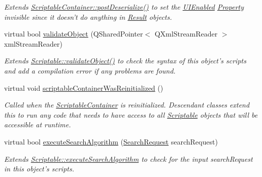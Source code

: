 \begin{DoxyCompactItemize}
\begin{DoxyCompactList}\small\item\em Extends \hyperlink{class_picto_1_1_scriptable_container_a0654af2c08f9a6c967a21b57614950ba}{Scriptable\-Container\-::post\-Deserialize()} to set the \hyperlink{class_picto_1_1_u_i_enabled}{U\-I\-Enabled} \hyperlink{class_picto_1_1_property}{Property} invisible since it doesn't do anything in \hyperlink{class_picto_1_1_result}{Result} objects. \end{DoxyCompactList}\item 
\hypertarget{class_picto_1_1_control_target_result_a8c5964c5d142af68f1a3ef59379cf963}{virtual bool \hyperlink{class_picto_1_1_control_target_result_a8c5964c5d142af68f1a3ef59379cf963}{validate\-Object} (Q\-Shared\-Pointer$<$ Q\-Xml\-Stream\-Reader $>$ xml\-Stream\-Reader)}\label{class_picto_1_1_control_target_result_a8c5964c5d142af68f1a3ef59379cf963}

\begin{DoxyCompactList}\small\item\em Extends \hyperlink{class_picto_1_1_scriptable_ab6e2944c43a3b5d418bf7b251594386d}{Scriptable\-::validate\-Object()} to check the syntax of this object's scripts and add a compilation error if any problems are found. \end{DoxyCompactList}\item 
virtual void \hyperlink{class_picto_1_1_control_target_result_a6328bc782d1e2125da441c85c2a5059f}{scriptable\-Container\-Was\-Reinitialized} ()
\begin{DoxyCompactList}\small\item\em Called when the \hyperlink{class_picto_1_1_scriptable_container}{Scriptable\-Container} is reinitialized. Descendant classes extend this to run any code that needs to have access to all \hyperlink{class_picto_1_1_scriptable}{Scriptable} objects that will be accessible at runtime. \end{DoxyCompactList}\item 
\hypertarget{class_picto_1_1_control_target_result_aaf5e861e7d0ca2b3dac1890300c8cac4}{virtual bool \hyperlink{class_picto_1_1_control_target_result_aaf5e861e7d0ca2b3dac1890300c8cac4}{execute\-Search\-Algorithm} (\hyperlink{struct_search_request}{Search\-Request} search\-Request)}\label{class_picto_1_1_control_target_result_aaf5e861e7d0ca2b3dac1890300c8cac4}

\begin{DoxyCompactList}\small\item\em Extends \hyperlink{class_picto_1_1_u_i_enabled_a97cb540bf9702a5af91a9eeddde39db9}{Scriptable\-::execute\-Search\-Algorithm} to check for the input search\-Request in this object's scripts. \end{DoxyCompactList}\end{DoxyCompactItemize}
